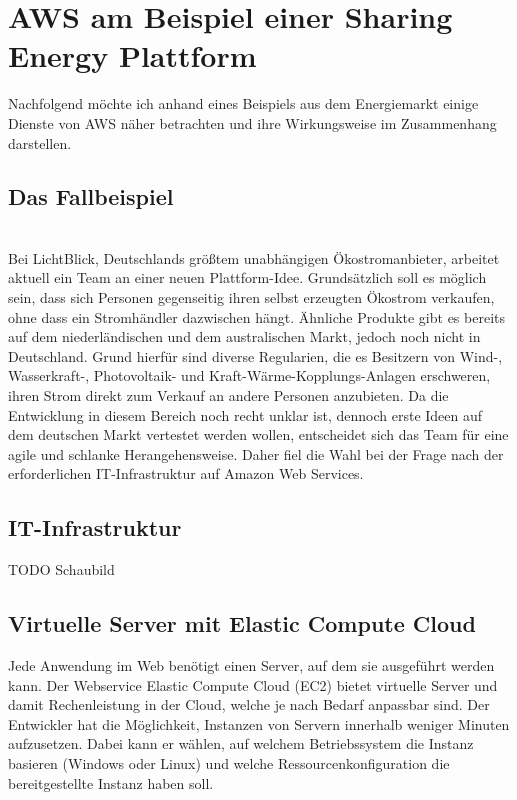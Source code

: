 \chapter{AWS am Beispiel einer Sharing Energy Plattform}\label{chapter:kapitellabel} %
Nachfolgend möchte ich anhand eines Beispiels aus dem Energiemarkt einige Dienste von AWS näher betrachten und ihre Wirkungsweise im Zusammenhang darstellen.

\section{Das Fallbeispiel}
\label{sec:fallbeispiel}
\\ Bei LichtBlick, Deutschlands größtem unabhängigen Ökostromanbieter, arbeitet aktuell ein Team an einer neuen Plattform-Idee. Grundsätzlich soll es möglich sein, dass sich Personen gegenseitig ihren selbst erzeugten Ökostrom verkaufen, ohne dass ein Stromhändler dazwischen hängt. Ähnliche Produkte gibt es bereits auf dem niederländischen und dem australischen Markt, jedoch noch nicht in Deutschland. Grund hierfür sind diverse Regularien, die es Besitzern von Wind-, Wasserkraft-, Photovoltaik- und Kraft-Wärme-Kopplungs-Anlagen erschweren, ihren Strom direkt zum Verkauf an andere Personen anzubieten. Da die Entwicklung in diesem Bereich noch recht unklar ist, dennoch erste Ideen auf dem deutschen Markt vertestet werden wollen, entscheidet sich das Team für eine agile und schlanke Herangehensweise. Daher fiel die Wahl bei der Frage nach der erforderlichen IT-Infrastruktur auf Amazon Web Services.


\section{IT-Infrastruktur}
\label{sec:infrastruktur}

TODO Schaubild

\section{Virtuelle Server mit Elastic Compute Cloud}
\label{sec:ec2}
Jede Anwendung im Web benötigt einen Server, auf dem sie ausgeführt werden kann. Der Webservice Elastic Compute Cloud (EC2) bietet virtuelle Server und damit Rechenleistung in der Cloud, welche je nach Bedarf anpassbar sind. \cite{aws:ec2}
Der Entwickler hat die Möglichkeit, Instanzen von Servern innerhalb weniger Minuten aufzusetzen. Dabei kann er wählen, auf welchem Betriebssystem die Instanz basieren (Windows oder Linux) und welche Ressourcenkonfiguration die bereitgestellte Instanz haben soll. \cite{aws:ec2} \\

